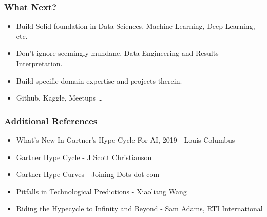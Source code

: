 \begin{frame}[fragile]\frametitle{What Next?}


\begin{itemize}
\item Build Solid foundation in Data Sciences, Machine Learning, Deep Learning, etc.
\item Don't ignore seemingly mundane, Data Engineering and Results Interpretation.
\item Build specific domain expertise and projects therein.
\item Github, Kaggle, Meetups \ldots
\end{itemize}

\end{frame}


\begin{frame}[fragile]\frametitle{Additional References}


\begin{itemize}
\item What's New In Gartner's Hype Cycle For AI, 2019 - Louis Columbus
\item Gartner Hype Cycle - J Scott Christianson
\item Gartner Hype Curves - Joining Dots dot com
\item Pitfalls in Technological Predictions - Xiaoliang Wang
\item Riding the Hypecycle to Infinity and Beyond - Sam Adams, RTI International
\end{itemize}

\end{frame}


